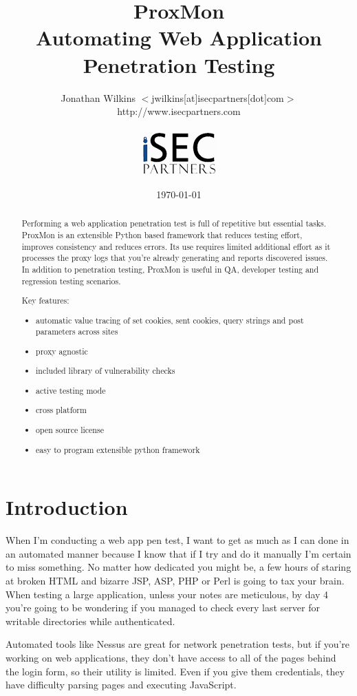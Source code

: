\documentclass{article}
\title{ProxMon\\
Automating Web Application Penetration Testing}
\author{Jonathan Wilkins $<$jwilkins[at]isecpartners[dot]com$>$\\
http://www.isecpartners.com\\
\\
\includegraphics[scale=0.45]{iseclogo.png}
}
\date{\today}
\begin{document}
\maketitle
\thispagestyle{fancy}
\begin{abstract}
Performing a web application penetration test is full of repetitive but 
essential tasks.  ProxMon is an extensible Python based framework that 
reduces testing effort, improves consistency and reduces errors.  Its use 
requires limited additional effort as it processes the proxy logs that you're
already generating and reports discovered issues.  In addition to penetration 
testing, ProxMon is useful in QA, developer testing and regression testing scenarios.

Key features:
\begin{itemize}
\item{automatic value tracing of set cookies, sent cookies, query strings and post parameters across sites}
\item{proxy agnostic}
\item{included library of vulnerability checks}
\item{active testing mode}
\item{cross platform}
\item{open source license}
\item{easy to program extensible python framework}
\end{itemize}
\end{abstract}

\section{Introduction}
When I'm conducting a web app pen test, I want to get as much as I can done in 
an automated manner because I know that if I try and do
it manually I'm certain to miss something.  No matter how dedicated you might be, 
a few hours of staring at broken HTML and bizarre JSP, ASP, PHP or Perl is going to 
tax your brain.  When testing a large application, unless your notes are
meticulous, by day 4 you're going to be wondering if you managed to check
every last server for writable directories while authenticated.

Automated tools like Nessus are great for network penetration tests, but if you're
working on web applications, they don't have access to all of the pages behind the
login form, so their utility is limited.  Even if you give them credentials, they
have difficulty parsing pages and executing JavaScript.
\end{document}

